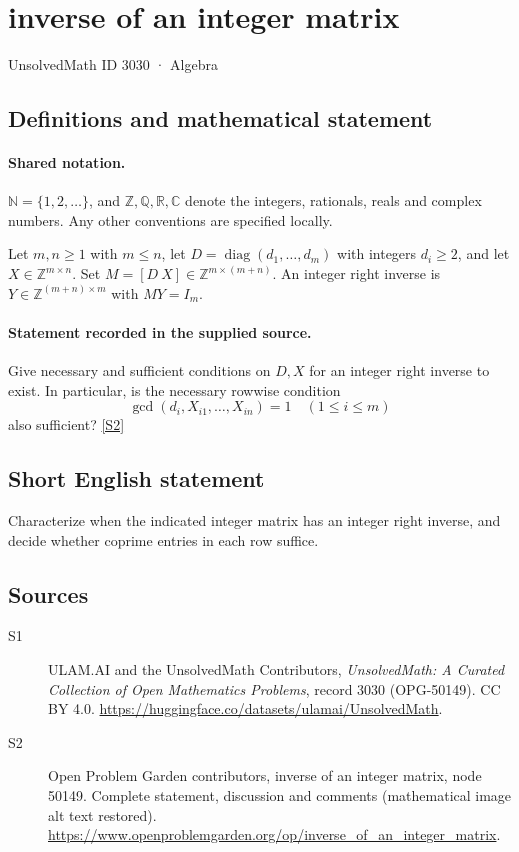 \documentclass[11pt]{book}
\newcommand{\sref}[2]{\hyperlink{source:#1:#2}{[S#2]}}
\begin{document}
\setcounter{section}{3029}
\section{inverse of an integer matrix}\label{3030}
{\small\sffamily UnsolvedMath ID 3030 · Algebra}
\subsection{Definitions and mathematical statement}

\paragraph{Shared notation.}$\mathbb N=\{1,2,\ldots\}$, and $\mathbb Z,\mathbb Q,\mathbb R,\mathbb C$ denote the integers, rationals, reals and complex numbers. Any other conventions are specified locally.


Let $m,n\geq1$ with $m\leq n$, let $D=\operatorname{diag}(d_1,\ldots,d_m)$ with integers $d_i\geq2$, and let $X\in\mathbb Z^{m\times n}$. Set $M=[D\ X]\in\mathbb Z^{m\times(m+n)}$. An integer right inverse is $Y\in\mathbb Z^{(m+n)\times m}$ with $MY=I_m$.
\paragraph{Statement recorded in the supplied source.}
Give necessary and sufficient conditions on $D,X$ for an integer right inverse to exist. In particular, is the necessary rowwise condition
\[\gcd(d_i,X_{i1},\ldots,X_{in})=1\quad(1\leq i\leq m)\]
also sufficient? \sref{3030}{2}
\subsection{Short English statement}
Characterize when the indicated integer matrix has an integer right inverse, and decide whether coprime entries in each row suffice.
\subsection{Sources}
\begin{description}
\item[\hypertarget{source:3030:1}{S1}] ULAM.AI and the UnsolvedMath Contributors, \emph{UnsolvedMath: A Curated Collection of Open Mathematics Problems}, record 3030 (OPG-50149). CC BY 4.0. \url{https://huggingface.co/datasets/ulamai/UnsolvedMath}.
\item[\hypertarget{source:3030:2}{S2}] Open Problem Garden contributors, inverse of an integer matrix, node 50149. Complete statement, discussion and comments (mathematical image alt text restored). \url{https://www.openproblemgarden.org/op/inverse_of_an_integer_matrix}.
\end{description}
\label{end:3030}
\end{document}

